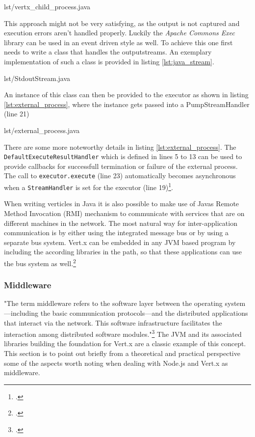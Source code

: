 %
{lst/vertx_child_process.java}

This approach might not be very satisfying, as the output is not captured and
execution errors aren't handled properly. Luckily the \textit{Apache Commons Exec} library
can be used in an event driven style as well. To achieve this one first needs to
write a class that handles the outputstreams.
An exemplary implementation of such a class is provided in listing
\ref{lst:java_stream}.

%
{lst/StdoutStream.java}

An instance of this class can then be provided to the executor as shown in
listing \ref{lst:external_process}, where the instance gets passed into a PumpStreamHandler (line 21)

%
{lst/external_process.java}

There are some more noteworthy details in listing \ref{lst:external_process}.
The \texttt{DefaultExecuteResultHandler} which is defined in lines 5 to
13 can be used to provide callbacks for successfull termination or failure of
the external process. The call to \texttt{executor.execute} (line 23) automatically becomes
asynchronous when a \texttt{StreamHandler} is set for the executor (line 19)\footcite[Cf.][]{apache_2010}.



When writing verticles in Java it is also possible to make use of Javas Remote
Method Invocation (RMI) mechanism to communicate with services that are on different
machines in the network.
The most natural way for inter-application communication is by either using the
integrated message bus or by using a separate bus system.
Vert.x can be embedded in any JVM based program by including the according
libraries in the path, so that these applications can use the bus system as
well.\footcite[Cf.][]{vertx_2012}

\subsubsection{Middleware}
\label{middleware}
"The term middleware refers to the software layer between the operating system—including the basic communication protocols—and the distributed applications that interact via the network. This software infrastructure facilitates the
interaction among distributed software modules."\footcite[]{Geihs_2001} The JVM and its associated libraries building the foundation for Vert.x are a classic example of this concept. This section is to point out briefly from a theoretical and practical perspective some of the aspects worth noting when dealing with Node.js and Vert.x as middleware.\\

